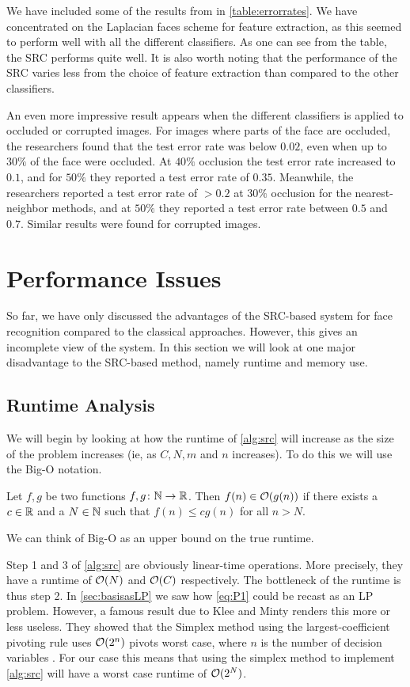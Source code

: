We have included some of the results from \cite{wright09facerecog} in \cref{table:errorrates}. We have concentrated on the Laplacian faces scheme for feature extraction, as this seemed to perform well with all the different classifiers. As one can see from the table, the SRC performs quite well. It is also worth noting that the performance of the SRC varies less from the choice of feature extraction than compared to the other classifiers.

An even more impressive result appears when the different classifiers is applied to occluded or corrupted images. For images where parts of the face are occluded, the researchers found that the test error rate was below $ 0.02 $, even when up to $ 30\% $ of the face were occluded. At $ 40\% $ occlusion the test error rate increased to $ 0.1 $, and for $ 50\% $ they reported a test error rate of $ 0.35 $. Meanwhile, the researchers reported a test error rate of $ > 0.2 $ at $ 30\% $ occlusion for the nearest-neighbor methods, and at $ 50\% $ they reported a test error rate between $ 0.5 $ and $ 0.7 $. Similar results were found for corrupted images. 




\section{Performance Issues}
So far, we have only discussed the advantages of the SRC-based system for face recognition compared to the classical approaches. However, this gives an incomplete view of the system. In this section we will look at one major disadvantage to the SRC-based method, namely runtime and memory use. 

\subsection{Runtime Analysis}
We will begin by looking at how the runtime of \cref{alg:src} will increase as the size of the problem increases (ie, as $ C, N, m $ and $ n $ increases). To do this we will use the Big-O notation.
\begin{definition}
	Let $ f, g $ be two functions $ f, g\colon\mathbb{N}\to\mathbb{R} $. Then $ f(n) \in \mathcal{O}(g(n)) $ if there exists a $ c \in \mathbb{R} $ and a $ N \in \mathbb{N} $ such that $ f(n) \leq cg(n) $ for all $ n > N $.
\end{definition}
\noindent We can think of Big-O as an upper bound on the true runtime.

Step 1 and 3 of \cref{alg:src} are obviously linear-time operations. More precisely, they have a runtime of  $ \mathcal{O}(N) $ and $ \mathcal{O}(C) $ respectively. The bottleneck of the runtime is thus step 2. In \cref{sec:basisasLP} we saw how \eqref{eq:P1} could be recast as an LP problem. However, a famous result due to Klee and Minty renders this more or less useless. They showed that the Simplex method using the largest-coefficient pivoting rule uses $ \mathcal{O}(2^{n}) $ pivots worst case, where $ n $ is the number of decision variables \cite[Section~4.4]{vanderbei14linprog}. For our case this means that using the simplex method to implement \cref{alg:src} will have a worst case runtime of $ \mathcal{O}(2^{N}) $.

